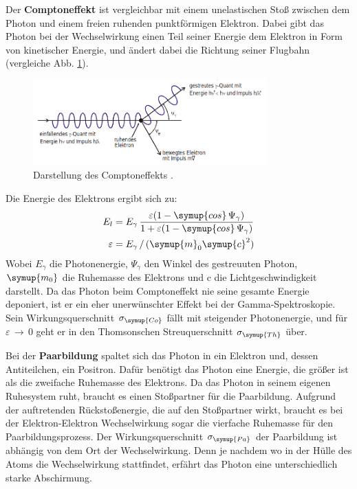 Der \textbf{Comptoneffekt} ist vergleichbar mit einem unelastischen Stoß zwischen
dem Photon und einem freien ruhenden punktförmigen Elektron. Dabei gibt das Photon
bei der Wechselwirkung einen Teil seiner Energie dem Elektron in Form von kinetischer Energie, und
ändert dabei die Richtung seiner Flugbahn (vergleiche Abb. \ref{fig:compton_skizze}).
\begin{figure}
  \centering
  \includegraphics[width=0.8\textwidth]{compton_skizze.png}
  \caption{Darstellung des Comptoneffekts \cite{anleitungv18}.}
  \label{fig:compton_skizze}
\end{figure}
Die Energie des Elektrons ergibt sich zu:
\begin{align}
  E_l &= E_\gamma \,\frac{\varepsilon(1-\symup{cos}\,\Psi_\gamma)}{1+\varepsilon(1-\symup{cos}\,\Psi_\gamma)}\\
  \varepsilon &= E_\gamma\,/\,(\symup{m}_0 \symup{c}^2)\\
\end{align}
Wobei $E_\gamma$ die Photonenergie, $\Psi_\gamma$ den Winkel des gestreuuten Photon,
$\symup{m_0}$ die Ruhemasse des Elektrons und c die Lichtgeschwindigkeit darstellt.
Da das Photon beim Comptoneffekt nie seine gesamte Energie deponiert, ist er ein
eher unerwünschter Effekt bei der Gamma-Spektroskopie. Sein Wirkungsquerschnitt $\sigma_{\symup{Co}}$
fällt mit steigender Photonenergie, und für $\varepsilon\, \to \, 0$ geht er in den
Thomsonschen Streuquerschnitt $\sigma_{\symup{Th}}$ über.

Bei der \textbf{Paarbildung} spaltet sich das Photon in ein Elektron und, dessen Antiteilchen, ein Positron.
Dafür benötigt das Photon eine Energie, die größer ist als die zweifache Ruhemasse des Elektrons.
Da das Photon in seinem eigenen Ruhesystem ruht, braucht es einen Stoßpartner für die Paarbildung.
Aufgrund der auftretenden Rückstoßenergie, die auf den Stoßpartner wirkt, braucht es bei der
Elektron-Elektron Wechselwirkung sogar die vierfache Ruhemasse für den Paarbildungsprozess.
Der Wirkungsquerschnitt $\sigma_{\symup{Pa}}$ der Paarbildung ist abhängig von dem Ort der Wechselwirkung.
Denn je nachdem wo in der Hülle des Atoms die Wechselwirkung stattfindet, erfährt das Photon eine unterschiedlich
starke Abschirmung.


